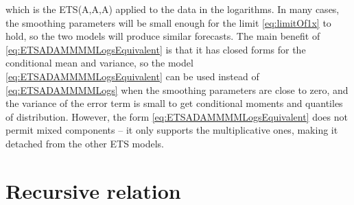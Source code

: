 \documentclass[
]{book}
\theoremstyle{definition}
\theoremstyle{definition}
\theoremstyle{definition}
\theoremstyle{definition}
\theoremstyle{remark}
\begin{document}
which is the ETS(A,A,A) applied to the data in the logarithms. In many cases, the smoothing parameters will be small enough for the limit \eqref{eq:limitOf1x} to hold, so the two models will produce similar forecasts. The main benefit of \eqref{eq:ETSADAMMMMLogsEquivalent} is that it has closed forms for the conditional mean and variance, so the model \eqref{eq:ETSADAMMMMLogsEquivalent} can be used instead of \eqref{eq:ETSADAMMMMLogs} when the smoothing parameters are close to zero, and the variance of the error term is small to get conditional moments and quantiles of distribution. However, the form \eqref{eq:ETSADAMMMMLogsEquivalent} does not permit mixed components -- it only supports the multiplicative ones, making it detached from the other ETS models.

\hypertarget{adamETSPuremultiplicativeRecursive}{%
\section{Recursive relation}\label{adamETSPuremultiplicativeRecursive}}
\end{document}

